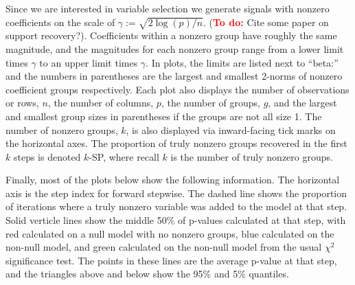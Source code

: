 \documentclass{imsart}
\newcommand{\todo}{\textcolor{red}{\textbf{To do: }}}
\begin{document}
Since we are interested in variable selection we generate signals with
nonzero coefficients on the scale of $\gamma := \sqrt{2 \log(p)/n}$.
(\todo Cite some paper on support recovery?). Coefficients within a
nonzero group have roughly the same magnitude, and the magnitudes for
each nonzero group range from a lower limit times $\gamma$ to an upper
limit times $\gamma$. In plots, the limits are listed next to ``beta:''
and the numbers in parentheses are the largest and smallest 2-norms of
nonzero coefficient groups respectively. Each plot also displays the
number of observations or rows, $n$, the number of columns, $p$, the
number of groups, $g$, and the largest and smallest group sizes in
parentheses if the groups are not all size 1. The number of nonzero
groups, $k$, is also displayed via inward-facing tick marks on the
horizontal axes. The proportion of truly
nonzero groups recovered in the first $k$ steps is denoted $k$-SP,
where recall $k$ is the number of truly nonzero groups. 

Finally, most of the plots below show the following information. The
horizontal axis is the step index for forward stepwise. The dashed
line shows the proportion of iterations where a truly nonzero variable
was added to the model at that step. Solid verticle lines show the
middle 50\% of p-values calculated at that step, with red calculated
on a null model with no nonzero groups, blue calculated on the non-null
model, and green calculated on the non-null model from the usual
$\chi^2$ significance test.
The points in these lines are the average p-value at that step, and
the triangles above and below show the 95\% and 5\% quantiles.
\end{document}

